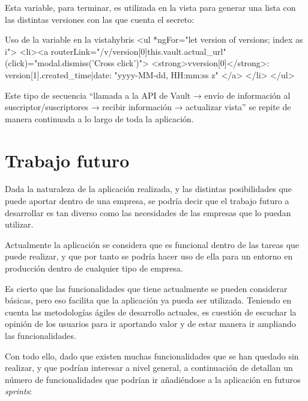 \documentclass{\ClassPath/viu-tfm-template}
\begin{document}
Esta variable, para terminar, es utilizada en la vista para generar una lista con las distintas versiones con las que cuenta el secreto:

\begin{mycode}{Uso de la variable  en la vista}{hybris}{}
<ul *ngFor="let version of versions; index as i">
  <li><a routerLink="/v/{{version[0]}}{{this.vault.actual_url}}"
    (click)="modal.dismiss('Cross click')">
      <strong>v{{version[0]}}</strong>:
        {{version[1].created_time|date: "yyyy-MM-dd, HH:mm:ss z"}}
    </a>
  </li>
</ul>
\end{mycode}

Este tipo de secuencia “llamada a la API de Vault → envío de información al suscriptor/suscriptores → recibir información → actualizar vista” se repite de manera continuada a lo largo de toda la aplicación.


\chapter{Trabajo futuro}

Dada la naturaleza de la aplicación realizada, y las distintas posibilidades que puede aportar dentro de una empresa, se podría decir que el trabajo futuro a desarrollar es tan diverso como las necesidades de las empresas que lo puedan utilizar.

Actualmente la aplicación se considera que es funcional dentro de las tareas que puede realizar, y que por tanto se podría hacer uso de ella para un entorno en producción dentro de cualquier tipo de empresa.

Es cierto que las funcionalidades que tiene actualmente se pueden considerar básicas, pero eso facilita que la aplicación ya pueda ser utilizada. Teniendo en cuenta las metodologías ágiles de desarrollo actuales, es cuestión de escuchar la opinión de los usuarios para ir aportando valor y de estar manera ir ampliando las funcionalidades.

Con todo ello, dado que existen muchas funcionalidades que se han quedado sin realizar, y que podrían interesar a nivel general, a continuación de detallan un número de funcionalidades que podrían ir añadiéndose a la aplicación en futuros \textit{sprints}:
\end{document}

